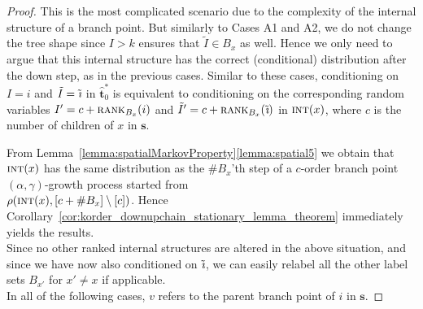 \documentclass[a4paper, final]{amsart}
\theoremstyle{plain}
\theoremstyle{definition}
\newcommand{\tree}[1][t]{\boldsymbol{#1}}
\newcommand{\that}[1][t]{\hat{\boldsymbol{#1}}} %
\DeclareMathOperator{\intstruct}{\textsc{int}}
\DeclareMathOperator{\rank}{\textsc{rank}}
\DeclareMathOperator{\tildei}{\tilde{\textit{\i}}}
\DeclareMathOperator{\ocrp}{oCRP}
\begin{document}
\begin{proof}
  This is the most complicated scenario due to the complexity of the internal structure of a branch point.
  But similarly to Cases A1 and A2, we do not change the tree shape since $I > k$ ensures that $\tilde{I} \in B_x$ as well.
  Hence we only need to argue that this internal structure has the correct (conditional) distribution after the down step, as in the previous cases.
  Similar to these cases, conditioning on $I = i$ and $\tilde{I} = \tildei$ in $\that_0^*$ is equivalent to conditioning on the corresponding random variables $I' = c + \rank_{B_x}(i)$ and $\tilde{I}' = c + \rank_{B_x}(\tildei)$ in $\intstruct(x)$, where $c$ is the number of children of $x$ in $\tree[s]$.
  
  From Lemma~\ref{lemma:spatialMarkovProperty}\ref{lemma:spatial5} we obtain that $\intstruct(x)$ has the same distribution as the $\# B_x$'th step of a $c$-order branch point $(\alpha, \gamma)$-growth process started from \\ $\rho (\intstruct (x), [c + \# B_x] \setminus [c])$.
  Hence Corollary~\ref{cor:korder_downupchain_stationary_lemma_theorem} immediately yields the results. \\

  Since no other ranked internal structures are altered in the above situation, and since we have now also conditioned on $\tildei$, we can easily relabel all the other label sets $B_{x'}$ for $x' \neq x$ if applicable. \\

  In all of the following cases, $v$ refers to the parent branch point of $i$ in $\tree[s]$.


\end{proof}
\end{document}
